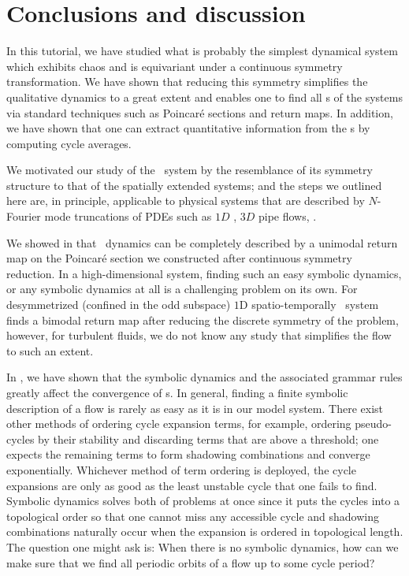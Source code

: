 \section{Conclusions and discussion}
\label{s:concl}

In this tutorial, we have studied what is probably the simplest dynamical system which
exhibits chaos and is equivariant under a continuous symmetry transformation.
We have shown that reducing this symmetry simplifies the qualitative dynamics
to a great extent and enables one to find all \rpo s of the systems via
standard techniques such as Poincar\'e sections and return maps. In
addition, we have shown that one can extract quantitative information
from the \rpo s by computing cycle averages.

We motivated our study of the \twomode\ system by the resemblance of its
symmetry structure to that of the spatially extended systems; and the
steps we outlined here are, in principle, applicable to physical systems
that are described by $N$-Fourier mode truncations of PDEs such as $1D$
\KS{}, $3D$ pipe flows, \etc.

We showed in  that \twomode\ dynamics can be completely
described by a unimodal return map on the Poincar\'e section we constructed
after continuous symmetry reduction. In a high-dimensional system, finding such
an easy symbolic dynamics, or any symbolic dynamics at all is a challenging
problem on its own. For desymmetrized (confined in the odd subspace) $1$D
spatio-temporally \KS\ system  finds a bimodal return map after
reducing the discrete symmetry of the problem, however, for turbulent fluids,
we do not know any study that simplifies the flow to such an extent.

In , we have shown that the symbolic dynamics and the
associated grammar rules greatly affect the convergence of \cycForm s.
In general, finding a finite symbolic description of a flow is
rarely as easy as it is in our model system.
There exist other methods of ordering cycle
expansion terms, for example, ordering pseudo-cycles by their stability and discarding terms
that are above a threshold; one expects the remaining terms to form
shadowing combinations and converge exponentially.
Whichever method of term ordering is deployed, the cycle expansions are only as good
as the least unstable cycle that one fails to find. Symbolic dynamics solves both
of problems at once since it puts the cycles into a topological order so that
one cannot miss any accessible cycle and shadowing combinations naturally occur
when the expansion is ordered in topological length. The question one might ask
is: When there is no symbolic dynamics, how can we make sure that we find all
periodic orbits of a flow up to some cycle period?

